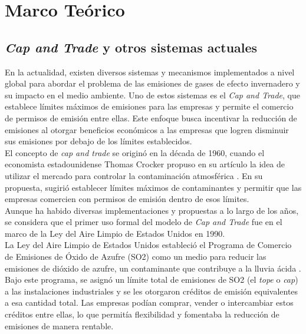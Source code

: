 
\chapter{Marco Teórico}
\label{c2} 


\section{\textit{Cap and Trade} y otros sistemas actuales}\label{c21}

En la actualidad, existen diversos sistemas y mecanismos implementados a nivel global para abordar el problema de las emisiones de gases de efecto invernadero y su impacto en el medio ambiente. Uno de estos sistemas es el \textit{Cap and Trade}, que establece límites máximos de emisiones para las empresas y permite el comercio de permisos de emisión entre ellas. Este enfoque busca incentivar la reducción de emisiones al otorgar beneficios económicos a las empresas que logren disminuir sus emisiones por debajo de los límites establecidos.\\

El concepto de \textit{cap and trade} se originó en la década de 1960, cuando el economista estadounidense Thomas Crocker propuso en su artículo la idea de utilizar el mercado para controlar la contaminación atmosférica . En su propuesta, sugirió establecer límites máximos de contaminantes y permitir que las empresas comercien con permisos de emisión dentro de esos límites.\\

Aunque ha habido diversas implementaciones y propuestas a lo largo de los años, se considera que el primer uso formal del modelo de \textit{Cap and Trade} fue en el marco de la Ley del Aire Limpio de Estados Unidos en 1990.\\

La Ley del Aire Limpio de Estados Unidos estableció el Programa de Comercio de Emisiones de Óxido de Azufre (SO2) como un medio para reducir las emisiones de dióxido de azufre, un contaminante que contribuye a la lluvia ácida . Bajo este programa, se asignó un límite total de emisiones de SO2 (el \textit{tope} o \textit{cap}) a las instalaciones industriales y se les otorgaron créditos de emisión equivalentes a esa cantidad total. Las empresas podían comprar, vender o intercambiar estos créditos entre ellas, lo que permitía flexibilidad y fomentaba la reducción de emisiones de manera rentable.\\


